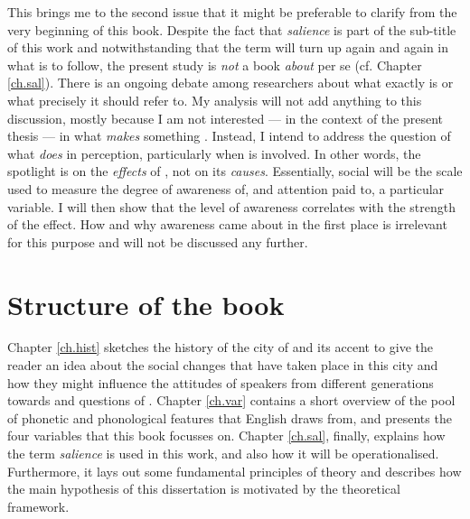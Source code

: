 This brings me to the second issue that it might be preferable to clarify from the very beginning of this book.
Despite the fact that \emph{salience} is part of the sub-title of this work and notwithstanding that the term will turn up again and again in what is to follow, the present study is \emph{not} a book \emph{about}  per se (cf. Chapter \ref{ch.sal}).
There is an ongoing debate among researchers about what exactly  is or what precisely it should refer to.
My analysis will not add anything to this discussion, mostly because I am not interested --- in the context of the present thesis --- in what \emph{makes} something .
Instead, I intend to address the question of what  \emph{does} in perception, particularly when  is involved.
In other words, the spotlight is on the \emph{effects} of , not on its \emph{causes}.
Essentially, social  will be the scale used to measure the degree of awareness of, and attention paid to, a particular variable.
I will then show that the level of awareness correlates with the strength of the  effect.
How and why awareness came about in the first place is irrelevant for this purpose and will not be discussed any further.

\section{Structure of the book}
\label{sec.intro.structure}

Chapter \ref{ch.hist} sketches the history of the city of  and its accent to give the reader an idea about the social changes that have taken place in this city and how they might influence the attitudes of speakers from different generations towards  and questions of .
Chapter \ref{ch.var} contains a short overview of the pool of phonetic and phonological features that  English draws from, and presents the four variables that this book focusses on.
Chapter \ref{ch.sal}, finally, explains how the term \emph{salience} is used in this work, and also how it will be operationalised.
Furthermore, it lays out some fundamental principles of  theory and describes how the main hypothesis of this dissertation is motivated by the theoretical framework.

